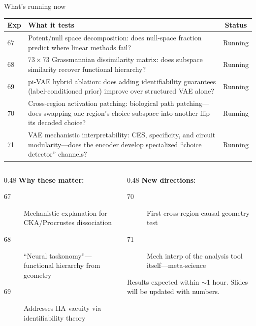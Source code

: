 \documentclass[aspectratio=169,11pt]{beamer}
\begin{document}
\begin{frame}{What's running now}
\vspace{-0.3em}
{\scriptsize
\begin{tabular}{lp{8.5cm}c}
\toprule
\textbf{Exp} & \textbf{What it tests} & \textbf{Status} \\
\midrule
67 & Potent/null space decomposition: does null-space fraction predict where linear methods fail? & \textcolor{causal}{Running} \\
68 & $73 \times 73$ Grassmannian dissimilarity matrix: does subspace similarity recover functional hierarchy? & \textcolor{causal}{Running} \\
69 & pi-VAE hybrid ablation: does adding identifiability guarantees (label-conditioned prior) improve over structured VAE alone? & \textcolor{causal}{Running} \\
70 & Cross-region activation patching: biological path patching---does swapping one region's choice subspace into another flip its decoded choice? & \textcolor{causal}{Running} \\
71 & VAE mechanistic interpretability: CES, specificity, and circuit modularity---does the encoder develop specialized ``choice detector'' channels? & \textcolor{causal}{Running} \\
\bottomrule
\end{tabular}
}

\vspace{0.8em}
\begin{columns}[T]
\begin{column}{0.48\textwidth}
\textbf{Why these matter:}
\begin{description}
  \item[67] Mechanistic explanation for CKA/Procrustes dissociation
  \item[68] ``Neural taskonomy''---functional hierarchy from geometry
  \item[69] Addresses IIA vacuity via identifiability theory
\end{description}
\end{column}
\begin{column}{0.48\textwidth}
\textbf{New directions:}
\begin{description}
  \item[70] First cross-region causal geometry test
  \item[71] Mech interp of the analysis tool itself---meta-science
\end{description}

\vspace{0.5em}
{\small Results expected within $\sim$1 hour. Slides will be updated with numbers.}
\end{column}
\end{columns}
\end{frame}
\end{document}
